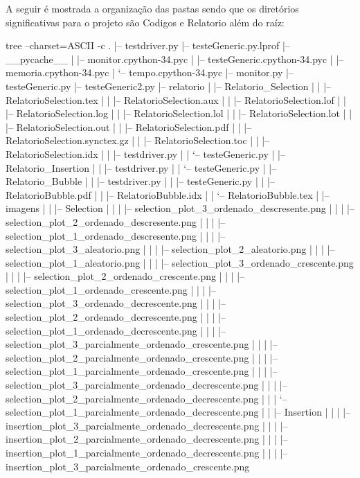\documentclass[12pt,a4paper,twoside]{report}
\begin{document}
A seguir é mostrada a organização das pastas sendo que os diretórios significativas para o projeto são Codigos e Relatorio além do raíz:
\begin{terminal}

tree --charset=ASCII -c
.
|-- testdriver.py
|-- testeGeneric.py.lprof
|-- __pycache__
|   |-- monitor.cpython-34.pyc
|   |-- testeGeneric.cpython-34.pyc
|   |-- memoria.cpython-34.pyc
|   `-- tempo.cpython-34.pyc
|-- monitor.py
|-- testeGeneric.py
|-- testeGeneric2.py
|-- relatorio
|   |-- Relatorio_Selection
|   |   |-- RelatorioSelection.tex
|   |   |-- RelatorioSelection.aux
|   |   |-- RelatorioSelection.lof
|   |   |-- RelatorioSelection.log
|   |   |-- RelatorioSelection.lol
|   |   |-- RelatorioSelection.lot
|   |   |-- RelatorioSelection.out
|   |   |-- RelatorioSelection.pdf
|   |   |-- RelatorioSelection.synctex.gz
|   |   |-- RelatorioSelection.toc
|   |   |-- RelatorioSelection.idx
|   |   |-- testdriver.py
|   |   `-- testeGeneric.py
|   |-- Relatorio_Insertion
|   |   |-- testdriver.py
|   |   `-- testeGeneric.py
|   |-- Relatorio_Bubble
|   |   |-- testdriver.py
|   |   |-- testeGeneric.py
|   |   |-- RelatorioBubble.pdf
|   |   |-- RelatorioBubble.idx
|   |   `-- RelatorioBubble.tex
|   |-- imagens
|   |   |-- Selection
|   |   |   |-- selection_plot_3_ordenado_descresente.png
|   |   |   |-- selection_plot_2_ordenado_descresente.png
|   |   |   |-- selection_plot_1_ordenado_descresente.png
|   |   |   |-- selection_plot_3_aleatorio.png
|   |   |   |-- selection_plot_2_aleatorio.png
|   |   |   |-- selection_plot_1_aleatorio.png
|   |   |   |-- selection_plot_3_ordenado_crescente.png
|   |   |   |-- selection_plot_2_ordenado_crescente.png
|   |   |   |-- selection_plot_1_ordenado_crescente.png
|   |   |   |-- selection_plot_3_ordenado_decrescente.png
|   |   |   |-- selection_plot_2_ordenado_decrescente.png
|   |   |   |-- selection_plot_1_ordenado_decrescente.png
|   |   |   |-- selection_plot_3_parcialmente_ordenado_crescente.png
|   |   |   |-- selection_plot_2_parcialmente_ordenado_crescente.png
|   |   |   |-- selection_plot_1_parcialmente_ordenado_crescente.png
|   |   |   |-- selection_plot_3_parcialmente_ordenado_decrescente.png
|   |   |   |-- selection_plot_2_parcialmente_ordenado_decrescente.png
|   |   |   `-- selection_plot_1_parcialmente_ordenado_decrescente.png
|   |   |-- Insertion
|   |   |   |-- insertion_plot_3_parcialmente_ordenado_decrescente.png
|   |   |   |-- insertion_plot_2_parcialmente_ordenado_decrescente.png
|   |   |   |-- insertion_plot_1_parcialmente_ordenado_decrescente.png
|   |   |   |-- insertion_plot_3_parcialmente_ordenado_crescente.png

\end{terminal}
\end{document}
